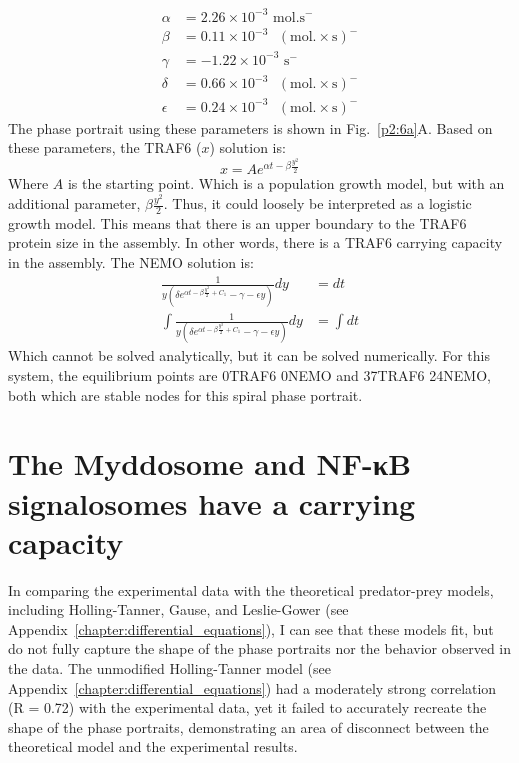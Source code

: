 \begin{equation*}
\begin{aligned}
\alpha &= 2.26\times 10^{-3} \text{ mol.} \text{s}^-\\
\beta &= 0.11\times 10^{-3} \text{ }(\text{mol.}\times \text{s})^-\\
\gamma &= -1.22\times 10^{-3} \text{ s}^-\\
\delta &= 0.66\times 10^{-3} \text{ } (\text{mol.}\times \text{s})^-\\ 
\epsilon &= 0.24\times 10^{-3} \text{ } (\text{mol.}\times \text{s})^- 
\end{aligned}
\end{equation*}
The phase portrait using these parameters is shown in Fig.~\ref{p2:6a}A. Based on these parameters, the TRAF6 ($x$) solution is:
\begin{equation*}
x = A e^{\alpha t - \beta \frac{y^2}{2}}
\end{equation*}
Where $A$ is the starting point. Which is a population growth model, but with an additional parameter, $\beta \frac{y^2}{2}$. Thus, it could loosely be interpreted as a logistic growth model. This means that there is an upper boundary to the TRAF6 protein size in the assembly. In other words, there is a TRAF6 carrying capacity in the assembly. The NEMO solution is:
\begin{equation*}
\begin{split}
\frac{1}{y(\delta e^{\alpha t - \beta\frac{y^2}{2} + C_1} - \gamma - \epsilon y)}dy &= dt \\
\int \frac{1}{y(\delta e^{\alpha t - \beta\frac{y^2}{2} + C_1} - \gamma - \epsilon y)}dy &= \int dt
\end{split}
\end{equation*}
Which cannot be solved analytically, but it can be solved numerically. For this system, the equilibrium points are 0\times TRAF6 0\times NEMO and 37\times TRAF6 24\times NEMO, both which are stable nodes for this spiral phase portrait.

\section{The Myddosome and NF-κB signalosomes have a carrying capacity}
In comparing the experimental data with the theoretical predator-prey models, including Holling-Tanner, Gause, and Leslie-Gower (see Appendix~\ref{chapter:differential_equations}), I can see that these models fit, but do not fully capture the shape of the phase portraits nor the behavior observed in the data. The unmodified Holling-Tanner model (see Appendix~\ref{chapter:differential_equations}) had a moderately strong correlation (R = 0.72) with the experimental data, yet it failed to accurately recreate the shape of the phase portraits, demonstrating an area of disconnect between the theoretical model and the experimental results.

